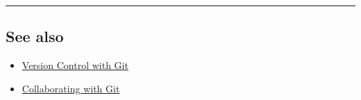 \begin{center}\rule{0.5\linewidth}{\linethickness}\end{center}

\hypertarget{see-also}{%
\subsection{See also}\label{see-also}}

\begin{itemize}
\tightlist
\item
  \href{https://swcarpentry.github.io/git-novice/}{Version Control with
  Git}
\item
  \href{https://www.atlassian.com/git/tutorials/syncing}{Collaborating
  with Git}
\end{itemize}

